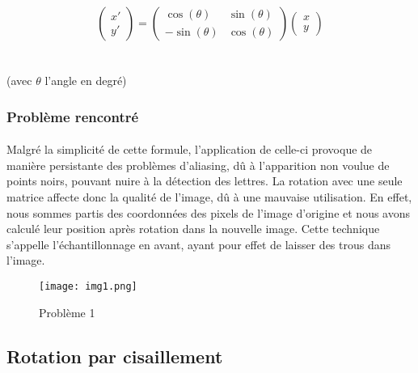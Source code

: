 \documentclass{article}
\begin{document}
$$\left( \begin{array}{cc} x' \\ y'\end{array}\right) = \left( \begin{array}{cc} \cos(\theta) & \sin(\theta) \\ -\sin(\theta) & \cos(\theta) \end{array}\right)\left(\begin{array}{cc} x \\ y\end{array}\right)$$ 
\\\\
(avec $\theta$  l’angle en degré)
\subsubsection{Problème rencontré}
\paragraph{}
Malgré la simplicité de cette formule, l’application de celle-ci provoque de manière persistante des problèmes d'aliasing, dû à l’apparition non voulue de points noirs, pouvant nuire à la détection des lettres. La rotation avec une seule matrice affecte donc la qualité de l’image, dû à une mauvaise utilisation. En effet, nous sommes partis des coordonnées des pixels de l'image d'origine et nous avons calculé leur position après rotation dans la nouvelle image. Cette technique s’appelle l'échantillonnage en avant, ayant pour effet de laisser des trous dans l’image.
\begin{figure}[H]
    \centering
    \texttt{[image: img1.png]}
    \caption{Problème 1}
\end{figure}
\subsection{Rotation par cisaillement}
\end{document}
